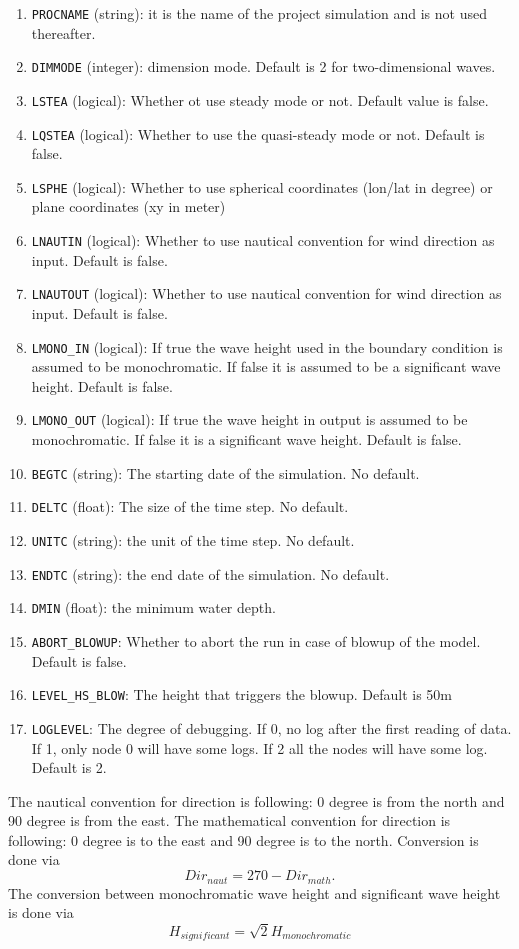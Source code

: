 \documentclass[12pt]{amsart}
\begin{document}
\begin{enumerate}
\item {\tt PROCNAME} (string): it is the name of the project simulation and is not used thereafter.
\item {\tt DIMMODE} (integer): dimension mode. Default is 2 for two-dimensional waves.
\item {\tt LSTEA} (logical): Whether ot use steady mode or not. Default value is false.
\item {\tt LQSTEA} (logical): Whether to use the quasi-steady mode or not. Default is false.
\item {\tt LSPHE} (logical): Whether to use spherical coordinates (lon/lat in degree) or plane coordinates (xy in meter)
\item {\tt LNAUTIN} (logical): Whether to use nautical convention for wind direction as input. Default is false.
\item {\tt LNAUTOUT} (logical): Whether to use nautical convention for wind direction as input. Default is false.
\item {\tt LMONO\_IN} (logical): If true the wave height used in the boundary condition is assumed to be monochromatic. If false it is assumed to be a significant wave height. Default is false.
\item {\tt LMONO\_OUT} (logical): If true the wave height in output is assumed to be monochromatic. If false it is a significant wave height. Default is false.
\item {\tt BEGTC} (string): The starting date of the simulation. No default.
\item {\tt DELTC} (float): The size of the time step. No default.
\item {\tt UNITC} (string): the unit of the time step. No default.
\item {\tt ENDTC} (string): the end date of the simulation. No default.
\item {\tt DMIN} (float): the minimum water depth.
\item {\tt ABORT\_BLOWUP}: Whether to abort the run in case of blowup of the model. Default is false.
\item {\tt LEVEL\_HS\_BLOW}: The height that triggers the blowup. Default is 50m
\item {\tt LOGLEVEL}: The degree of debugging. If 0, no log after the first reading of data. If 1, only node 0 will have some logs. If 2 all the nodes will have some log. Default is 2.
\end{enumerate}
The nautical convention for direction is following: 0 degree is from the north and 90 degree is from the east.
The mathematical convention for direction is following: 0 degree is to the east and 90 degree is to the north.
Conversion is done via
\begin{equation*}
Dir_{naut} = 270 - Dir_{math}.
\end{equation*}
The conversion between monochromatic wave height and significant wave height is done via
\begin{equation*}
H_{significant} = \sqrt{2} H_{monochromatic}
\end{equation*}
\end{document}
